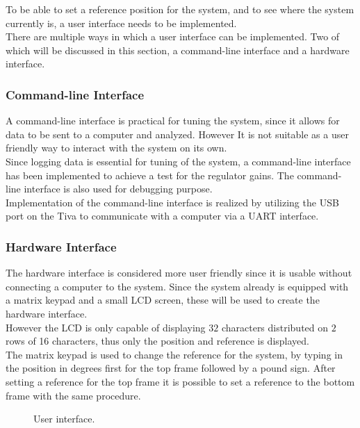\documentclass[../../../main]{subfiles}
\begin{document}
To be able to set a reference position for the system, and to see where the system currently is, a user interface needs to be implemented.\\
There are multiple ways in which a user interface can be implemented.
Two of which will be discussed in this section, a command-line interface and a hardware interface.

\subsubsection{Command-line Interface}%
\label{ssub:command-line_interface}
A command-line interface is practical for tuning the system, since it allows for data to be sent to a computer and analyzed.
However It is not suitable as a user friendly way to interact with the system on its own.
\\
Since logging data is essential for tuning of the system, a command-line interface has been implemented to achieve a test for the regulator gains.
The command-line interface is also used for debugging purpose.
\\
Implementation of the command-line interface is realized by utilizing the USB port on the Tiva to communicate with a computer via a UART interface.

\subsubsection{Hardware Interface}%
\label{ssub:hardware_interface}
The hardware interface is considered more user friendly since it is usable without connecting a computer to the system.
Since the system already is equipped with a matrix keypad and a small LCD screen, these will be used to create the hardware interface.
\\
However the LCD is only capable of displaying $32$ characters distributed on $2$ rows of 16 characters, thus only the position and reference is displayed.
\\
The matrix keypad is used to change the reference for the system, by typing in the position in degrees first for the top frame followed by a pound sign. 
After setting a reference for the top frame it is possible to set a reference to the bottom frame with the same procedure. 

\begin{figure}[H]
  \centering
  \def\svgwidth{\textwidth}
  
  \caption{User interface.}
  \label{fig:User_interface}
\end{figure}
\end{document}
